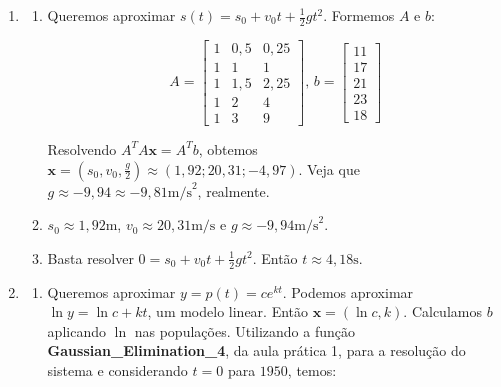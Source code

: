\documentclass[11pt]{article}
\begin{document}
\begin{enumerate}
\begin{enumerate}
\end{enumerate}

\item

\begin{enumerate}
    \item Queremos aproximar $s(t) = s_0 + v_0t + \frac{1}{2}gt^2$. Formemos $A$ e $b$:

    $$A = \begin{bmatrix}
    1& 0,5& 0,25\\
    1& 1& 1\\
    1& 1,5& 2,25\\
    1& 2& 4\\
    1& 3& 9
    \end{bmatrix}\textrm{, }
    b = \begin{bmatrix}
    11\\
    17\\
    21\\
    23\\
    18
    \end{bmatrix}$$
    
    Resolvendo $A^TA\mathbf{x}=A^Tb$, obtemos $\mathbf{x} = (s_0, v_0, \frac{g}{2}) \approx (1,92; 20,31; -4,97)$. Veja que $g \approx -9,94 \approx -9,81  \textrm{m/s}^2$, realmente.
    \bigbreak
    \item $s_0 \approx 1,92 \textrm{m}$, $v_0 \approx 20,31\textrm{m/s}$ e $g \approx -9,94 \textrm{m/s}^2$.
    \bigbreak
    \item Basta resolver $0 = s_0 + v_0t + \frac{1}{2}gt^2$. Então $t\approx 4,18 \textrm{s}$.
    \bigbreak
\end{enumerate}

\item 

\begin{enumerate}
    \item 
    Queremos aproximar $y = p(t) = ce^{kt}$. Podemos aproximar $\ln y = \ln c + kt$, um modelo linear. Então $\mathbf{x} = (\ln c, k)$. Calculamos $b$ aplicando $\ln$ nas populações. Utilizando a função \textbf{Gaussian\_Elimination\_4}, da aula prática 1, para a resolução do sistema e considerando $t=0$ para $1950$, temos:


\end{enumerate}
\end{enumerate}
\end{document}
